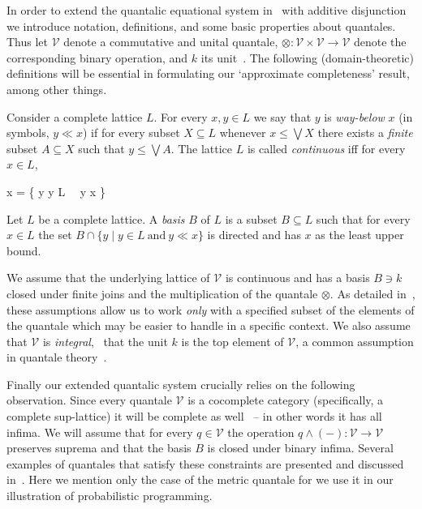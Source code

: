 \documentclass[a4paper,UKenglish,cleveref, autoref, thm-restate]{lipics-v2021}
\begin{document}
In order to extend the quantalic equational system
in~\cite{dahlqvist22,dahlqvist2023syntactic} with additive disjunction we
introduce notation, definitions, and some basic properties about quantales.
Thus let $\mathcal{V}$ denote a commutative and unital quantale, $\otimes :
\mathcal{V} \times \mathcal{V} \to \mathcal{V}$ denote the corresponding binary
operation, and $k$ its unit~\cite{paseka00}.  The following (domain-theoretic)
definitions will be essential in formulating our `approximate completeness'
result, among other things.
\begin{definition}
	Consider a complete lattice $L$.  For every $x, y \in L$ we say that
	$y$ is \emph{way-below} $x$ (in symbols, $y \ll x$) if for every
	subset $X \subseteq L$ whenever $x \leq \bigvee X$ there exists a
	\emph{finite} subset $A \subseteq X$ such that $y \leq \bigvee A$.
	The lattice $L$ is called \emph{continuous} iff for every $x \in L$,
	\begin{flalign*}
		x = \bigvee \{ y  \mid y \in L\  \ y \ll x \}
	\end{flalign*}
\end{definition}

\begin{definition}
	Let $L$ be a complete lattice. A \emph{basis} $B$ of $L$ is a subset
	$B \subseteq L$ such that for every $x \in L$ the set
	$B \cap \{ y \mid y \in L\ \text{and} \ y \ll x \}$ is directed and
	has $x$ as the least upper bound.
\end{definition}
We assume that the underlying lattice of $\mathcal{V}$ is continuous and has a
basis $B \ni k$ closed under finite joins and the multiplication of the
quantale $\otimes$. As detailed in~\cite{dahlqvist22,dahlqvist2023syntactic},
these assumptions allow us to work \emph{only} with a specified subset of the
elements of the quantale which may be easier to handle in a specific context.
We also assume that $\mathcal{V}$ is \emph{integral}, \ie\ that the unit $k$ is
the top element of $\mathcal{V}$, a common assumption in quantale
theory~\cite{velebil19}. 

Finally our extended quantalic system crucially relies on the following
observation.  Since every quantale $\mathcal{V}$ is a cocomplete category
(specifically, a complete sup-lattice) it will be complete as
well~\cite[Section 12]{cats} -- in other words it has all infima. We will
assume that for every $q \in \mathcal{V}$ the operation $q \wedge (-) :
\mathcal{V} \to \mathcal{V}$ preserves suprema and that the basis $B$ is closed
under binary infima.  Several examples of quantales that satisfy these
constraints are presented and discussed
in~\cite{dahlqvist22,dahlqvist2023syntactic}.  Here we mention only the case of
the metric quantale for we use it in our illustration of probabilistic
programming. 
\end{document}
